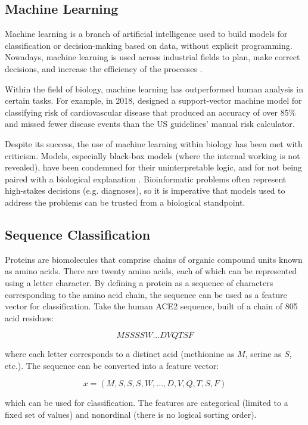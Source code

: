 \subsection{Machine Learning}

Machine learning is a branch of artificial intelligence used to build models for classification or decision-making based on data, without explicit programming. Nowadays, machine learning is used across industrial fields to plan, make correct decisions, and increase the efficiency of the processes \cite{Mottaqi2021}. 

Within the field of biology, machine learning has outperformed human analysis in certain tasks. For example, in 2018, \citeauthor{Kakadiaris2018} designed a support-vector machine model for classifying risk of cardiovascular disease that produced an accuracy of over 85\% and missed fewer disease events than the US guidelines' manual risk calculator.

Despite its success, the use of machine learning within biology has been met with criticism. Models, especially black-box models (where the internal working is not revealed), have been condemned for their uninterpretable logic, and for not being paired with a biological explanation \cite{Rudin2019}. Bioinformatic problems often represent high-stakes decisions (e.g. diagnoses), so it is imperative that models used to address the problems can be trusted from a biological standpoint.

\subsection{Sequence Classification}

Proteins are biomolecules that comprise chains of organic compound units known as amino acids. There are twenty amino acids, each of which can be represented using a letter character. By defining a protein as a sequence of characters corresponding to the amino acid chain, the sequence can be used as a feature vector for classification. Take the human ACE2 sequence, built of a chain of 805 acid residues:

\[ MSSSSW...DVQTSF \]

\noindent where each letter corresponds to a distinct acid (methionine as $M$, serine as $S$, etc.). The sequence can be converted into a feature vector:

\[ x = (M,S,S,S,W,...,D,V,Q,T,S,F) \]

\noindent which can be used for classification. The features are categorical (limited to a fixed set of values) and nonordinal (there is no logical sorting order). 

